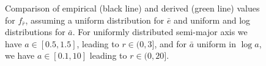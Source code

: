 \begin{figure}[ht]
\centering
{}
 \caption[Validation of analytical$r$ PDFs]{ Comparison of empirical (black line) and derived (green line) values for  $f_{\bar{r}}$, assuming a uniform distribution for $\bar e$ and uniform and log distributions for $\bar a$.  For uniformly distributed semi-major axis we have $a \in [0.5, 1.5]$, leading to $r \in (0, 3]$, and for $\bar a$ uniform in $\log a$, we have $a \in [0.1, 10]$ leading to $r \in (0, 20]$. \label{fig:compDists}}
\end{figure}  

